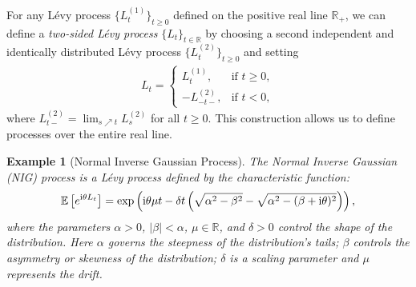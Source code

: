 \documentclass[10pt,a4paper,reqno]{amsart}
\theoremstyle{example}
\newtheorem{example}[theorem]{Example}
\newcommand*\I{\mathop{}\!\textnormal{i}}
\begin{document}
For any L\'evy process $\{L_t^{(1)}\}_{t \geq 0}$ defined on the positive real
line $\mathbb{R}_{+}$, we can define a \emph{two-sided L\'evy process}
$\{L_t\}_{t \in \mathbb{R}}$ by choosing a second independent and identically
distributed L\'evy process $\{L_t^{(2)}\}_{t \geq 0}$ and setting
\begin{align} 
L_t = \begin{cases}
L_t^{(1)}, & \text{if } t \geq 0, \\
- L_{-t-}^{(2)}, & \text{if } t < 0,
\end{cases} \label{eq:two-sided-levy}
\end{align}
where $L_{t-}^{(2)} = \lim_{s \nearrow t} L_s^{(2)}$ for all $t \geq 0$. This
construction allows us to define processes over the entire real line.
\begin{example}[Normal Inverse Gaussian Process]
  The Normal Inverse Gaussian (NIG) process is a Lévy process defined by the
  characteristic function: 
  \begin{align*}
    \mathbb{E}\left[ e^{\I \theta L_t} \right] = \exp\left( \I \theta \mu t -
    \delta t \left( \sqrt{\alpha^2 - \beta^2} - \sqrt{\alpha^2 - (\beta + \I
    \theta)^2} \right) \right),     
  \end{align*}
where the parameters $\alpha > 0$, $|\beta| < \alpha$, $\mu \in \mathbb{R}$, and
$\delta > 0$ control the shape of the distribution. Here $\alpha$ governs the
steepness of the distribution's tails; $\beta$ controls the asymmetry or
skewness of the distribution; $\delta$ is a scaling parameter and $\mu$ represents the drift.
\end{example}
\end{document}
